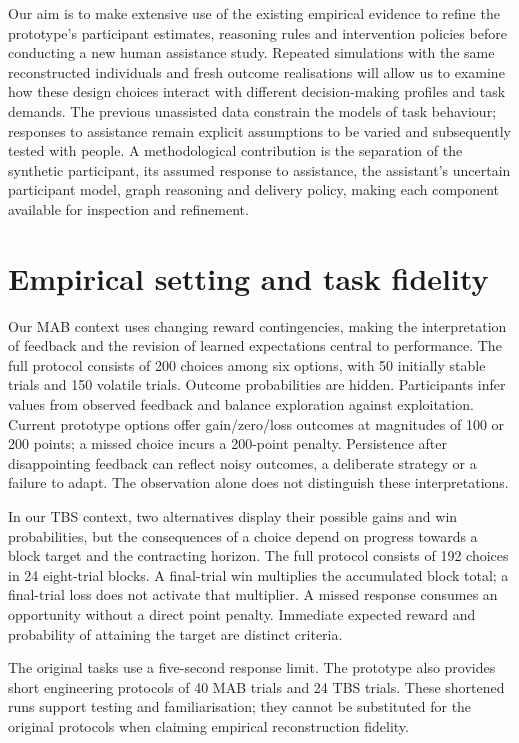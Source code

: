 \documentclass[11pt,a4paper]{article}
\begin{document}
Our aim is to make extensive use of the existing empirical evidence to refine the prototype's participant estimates, reasoning rules and intervention policies before conducting a new human assistance study. Repeated simulations with the same reconstructed individuals and fresh outcome realisations will allow us to examine how these design choices interact with different decision-making profiles and task demands. The previous unassisted data constrain the models of task behaviour; responses to assistance remain explicit assumptions to be varied and subsequently tested with people. A methodological contribution is the separation of the synthetic participant, its assumed response to assistance, the assistant's uncertain participant model, graph reasoning and delivery policy, making each component available for inspection and refinement.

\section{Empirical setting and task fidelity}

Our MAB context uses changing reward contingencies, making the interpretation of feedback and the revision of learned expectations central to performance. The full protocol consists of 200 choices among six options, with 50 initially stable trials and 150 volatile trials. Outcome probabilities are hidden. Participants infer values from observed feedback and balance exploration against exploitation. Current prototype options offer gain/zero/loss outcomes at magnitudes of 100 or 200 points; a missed choice incurs a 200-point penalty. Persistence after disappointing feedback can reflect noisy outcomes, a deliberate strategy or a failure to adapt. The observation alone does not distinguish these interpretations.

In our TBS context, two alternatives display their possible gains and win probabilities, but the consequences of a choice depend on progress towards a block target and the contracting horizon. The full protocol consists of 192 choices in 24 eight-trial blocks. A final-trial win multiplies the accumulated block total; a final-trial loss does not activate that multiplier. A missed response consumes an opportunity without a direct point penalty. Immediate expected reward and probability of attaining the target are distinct criteria.

The original tasks use a five-second response limit. The prototype also provides short engineering protocols of 40 MAB trials and 24 TBS trials. These shortened runs support testing and familiarisation; they cannot be substituted for the original protocols when claiming empirical reconstruction fidelity.
\end{document}
